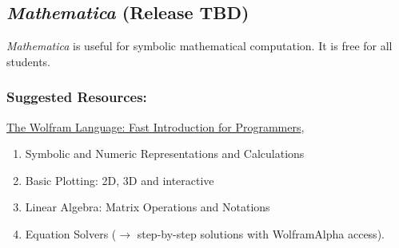 	\subsection{\textit{Mathematica} \hfill \normalsize(Release TBD)} \label{sec:Mathematica}
		\textit{Mathematica} is useful for symbolic mathematical computation. It is free for all students.
		
		\subsubsection*{Suggested Resources:}
		\href{https://www.wolfram.com/language/fast-introduction-for-programmers/interactive-usage/}{The Wolfram Language: Fast Introduction for Programmers}, 
			\begin{enumerate}
				\setlength{\itemsep}{0em}%
				\setlength{\parskip}{0em}%
				\item Symbolic and Numeric Representations and Calculations
				\item Basic Plotting: 2D, 3D and interactive
				\item Linear Algebra: Matrix Operations and Notations
				\item Equation Solvers ($\rightarrow$ step-by-step solutions with WolframAlpha access).
			\end{enumerate}